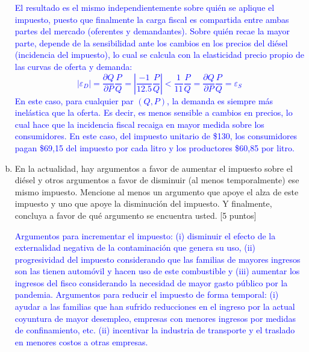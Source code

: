 \documentclass[11pt,letterpaper]{article}
\begin{document}
\begin{enumerate}[a)]
\textcolor{blue}{El resultado es el mismo independientemente sobre quién se aplique el impuesto, puesto que finalmente la carga fiscal es compartida entre ambas partes del mercado (oferentes y demandantes). Sobre quién recae la mayor parte, depende de la sensibilidad ante los cambios en los precios del diésel (incidencia del impuesto), lo cual se calcula con la elasticidad precio propio de las curvas de oferta y demanda:
$$|\varepsilon_D | =\frac{\partial Q}{\partial P} \frac{P}{Q}=|\frac{-1}{12.5} \frac{P}{Q}| < \frac{1}{11} \frac{P}{Q}=\frac{\partial Q}{\partial P} \frac{P}{Q}=\varepsilon_S$$
En este caso, para cualquier par $(Q, P)$, la demanda es siempre más inelástica que la oferta. Es decir, es menos sensible a cambios en precios, lo cual hace que la incidencia fiscal recaiga en mayor medida sobre los consumidores. En este caso, del impuesto unitario de \$130, los consumidores pagan \$69,15 del impuesto por cada litro y los productores \$60,85 por litro.
}
\item En la actualidad, hay argumentos a favor de aumentar el impuesto sobre el diésel y otros argumentos a favor de disminuir (al menos temporalmente) ese mismo impuesto. Mencione al menos un argumento que apoye el alza de este impuesto y uno que apoye la disminución del impuesto. Y finalmente, concluya a favor de qué argumento se encuentra usted. [5 puntos]

\textcolor{blue}{Argumentos para incrementar el impuesto: (i) disminuir el efecto de la externalidad negativa de la contaminación que genera su uso, (ii) progresividad del impuesto considerando que las familias de mayores ingresos son las tienen automóvil y hacen uso de este combustible  y (iii) aumentar los ingresos del fisco considerando la necesidad de mayor gasto público por la pandemia. Argumentos para reducir el impuesto de forma temporal: (i) ayudar a las familias que han sufrido reducciones en el ingreso por la actual coyuntura de mayor desempleo, empresas con menores ingresos por medidas de confinamiento, etc. (ii) incentivar la industria de transporte y el traslado en menores costos a otras empresas.
}

\end{enumerate}
\end{document}
